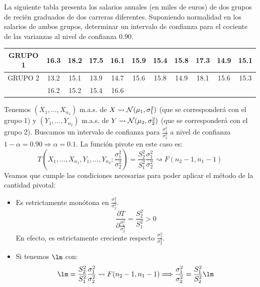 \begin{ejercicio}
    La siguiente tabla presenta los salarios anuales (en miles de euros) de dos grupos de recién graduados de dos carreras diferentes. Suponiendo normalidad en los salarios de ambos grupos, determinar un intervalo de confianza para el cociente de las varianzas al nivel de confianza $0.90$.
    \begin{table}[H]
    \centering
    \begin{tabular}{|c|cccccccccc|}
        \hline 
        GRUPO 1 & 16.3 & 18.2 & 17.5 & 16.1 & 15.9 & 15.4 & 15.8 & 17.3 & 14.9 & 15.1 \\
        \hline
        GRUPO 2 & 13.2 & 15.1 & 13.9 & 14.7 & 15.6 & 15.8 & 14.9 & 18.1 & 15.6 & 15.3 \\ 
                & 16.2 & 15.2 & 15.4 & 16.6 & & & & & &  \\
        \hline
    \end{tabular}
    \end{table}
    \noindent
    Tenemos $(X_1, \ldots, X_{n_1})$ m.a.s. de $X\rightsquigarrow\mathcal{N}(\mu_1,\sigma^2_1)$ (que se corresponderá con el grupo 1) y $(Y_1, \ldots, Y_{n_2})$ m.a.s. de $Y\rightsquigarrow\mathcal{N}(\mu_2,\sigma_2^2)$ (que se corresponderá con el grupo 2). Buscamos un intervalo de confianza para $\frac{\sigma_1^2}{\sigma_2^2}$ a nivel de confianza $1-\alpha = 0.90\Longrightarrow \alpha = 0.1$. La función pivote en este caso es:
    \begin{equation*}
        T\left(X_1, \ldots, X_{n_1},Y_1, \ldots, Y_{n_2};\frac{\sigma_1^2}{\sigma_2^2}\right) = \frac{S_2^2}{S_1^2} \frac{\sigma_1^2}{\sigma_2^2} \rightsquigarrow F(n_2-1,n_1-1)
    \end{equation*}
    Veamos que cumple las condiciones necesarias para poder aplicar el método de la cantidad pivotal:
    \begin{itemize}
        \item Es estrictamente monótona en $\frac{\sigma_1^2}{\sigma_2^2}$.
        \begin{equation*}
            \frac{\partial T}{\partial \frac{\sigma_1^2}{\sigma_2^2}} = \frac{S_2^2}{S_1^2} > 0
        \end{equation*}
        En efecto, es estrictamente creciente respecto $\frac{\sigma_1^2}{\sigma_2^2}$.
        \item Si tenemos $\lm$ con:
            \begin{equation*}
                \lm = \frac{S_2^2}{S_1^2} \frac{\sigma_1^2}{\sigma_2^2} \rightsquigarrow F(n_2-1,n_1-1) \Longrightarrow \frac{\sigma_1^2}{\sigma_2^2} = \frac{S_1^2}{S_2^2}\lm
            \end{equation*}
    \end{itemize}


\end{ejercicio}
